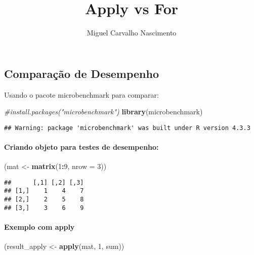 \documentclass[
]{article}
\title{Apply vs For}
\author{Miguel Carvalho Nascimento}
\date{}
\newenvironment{Shaded}{\begin{snugshade}}{\end{snugshade}}
\newcommand{\AttributeTok}[1]{\textcolor[rgb]{0.13,0.29,0.53}{#1}}
\newcommand{\CommentTok}[1]{\textcolor[rgb]{0.56,0.35,0.01}{\textit{#1}}}
\newcommand{\DecValTok}[1]{\textcolor[rgb]{0.00,0.00,0.81}{#1}}
\newcommand{\FunctionTok}[1]{\textcolor[rgb]{0.13,0.29,0.53}{\textbf{#1}}}
\newcommand{\NormalTok}[1]{#1}
\newcommand{\OtherTok}[1]{\textcolor[rgb]{0.56,0.35,0.01}{#1}}
\newcommand{\SpecialCharTok}[1]{\textcolor[rgb]{0.81,0.36,0.00}{\textbf{#1}}}
\begin{document}
\maketitle

\subsection{Comparação de
Desempenho}\label{comparauxe7uxe3o-de-desempenho}

Usando o pacote microbenchmark para comparar:

\begin{Shaded}
\begin{Highlighting}[]
\CommentTok{\#install.packages("microbenchmark")}
\FunctionTok{library}\NormalTok{(microbenchmark)}
\end{Highlighting}
\end{Shaded}

\begin{verbatim}
## Warning: package 'microbenchmark' was built under R version 4.3.3
\end{verbatim}

\paragraph{Criando objeto para testes de
desempenho:}\label{criando-objeto-para-testes-de-desempenho}

\begin{Shaded}
\begin{Highlighting}[]
\NormalTok{(mat }\OtherTok{\textless{}{-}} \FunctionTok{matrix}\NormalTok{(}\DecValTok{1}\SpecialCharTok{:}\DecValTok{9}\NormalTok{, }\AttributeTok{nrow =} \DecValTok{3}\NormalTok{))}
\end{Highlighting}
\end{Shaded}

\begin{verbatim}
##      [,1] [,2] [,3]
## [1,]    1    4    7
## [2,]    2    5    8
## [3,]    3    6    9
\end{verbatim}

\paragraph{Exemplo com apply}\label{exemplo-com-apply}

\begin{Shaded}
\begin{Highlighting}[]
\NormalTok{(result\_apply }\OtherTok{\textless{}{-}} \FunctionTok{apply}\NormalTok{(mat, }\DecValTok{1}\NormalTok{, sum))}
\end{Highlighting}
\end{Shaded}
\end{document}

